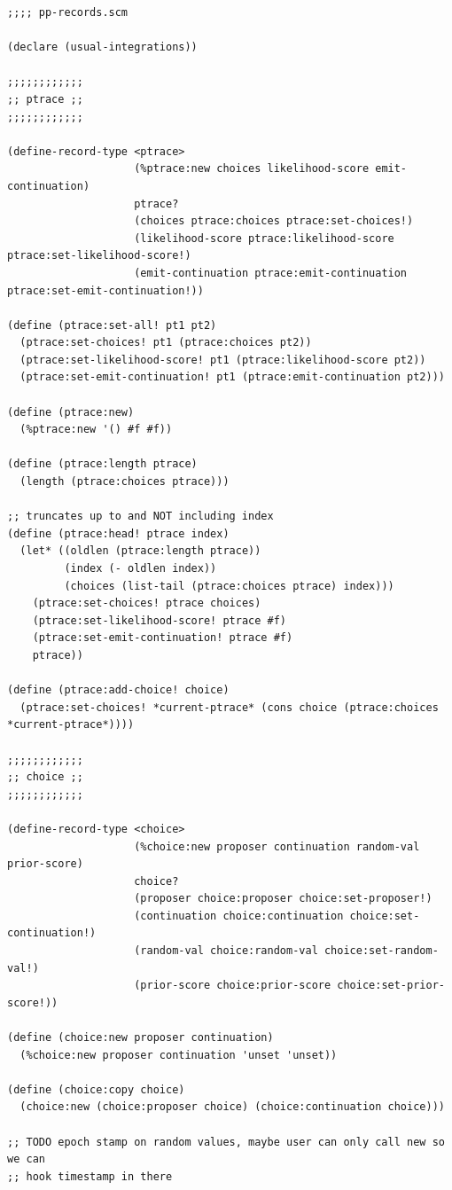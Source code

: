 \documentclass{article}
\begin{document}
\begin{verbatim}
;;;; pp-records.scm

(declare (usual-integrations))

;;;;;;;;;;;;
;; ptrace ;;
;;;;;;;;;;;;

(define-record-type <ptrace>
                    (%ptrace:new choices likelihood-score emit-continuation)
                    ptrace?
                    (choices ptrace:choices ptrace:set-choices!)
                    (likelihood-score ptrace:likelihood-score ptrace:set-likelihood-score!)
                    (emit-continuation ptrace:emit-continuation ptrace:set-emit-continuation!))

(define (ptrace:set-all! pt1 pt2)
  (ptrace:set-choices! pt1 (ptrace:choices pt2))
  (ptrace:set-likelihood-score! pt1 (ptrace:likelihood-score pt2))
  (ptrace:set-emit-continuation! pt1 (ptrace:emit-continuation pt2)))

(define (ptrace:new)
  (%ptrace:new '() #f #f))

(define (ptrace:length ptrace)
  (length (ptrace:choices ptrace)))

;; truncates up to and NOT including index
(define (ptrace:head! ptrace index)
  (let* ((oldlen (ptrace:length ptrace))
         (index (- oldlen index))
         (choices (list-tail (ptrace:choices ptrace) index)))
    (ptrace:set-choices! ptrace choices)
    (ptrace:set-likelihood-score! ptrace #f)
    (ptrace:set-emit-continuation! ptrace #f)
    ptrace))

(define (ptrace:add-choice! choice)
  (ptrace:set-choices! *current-ptrace* (cons choice (ptrace:choices *current-ptrace*))))

;;;;;;;;;;;;
;; choice ;;
;;;;;;;;;;;;

(define-record-type <choice>
                    (%choice:new proposer continuation random-val prior-score)
                    choice?
                    (proposer choice:proposer choice:set-proposer!)
                    (continuation choice:continuation choice:set-continuation!)
                    (random-val choice:random-val choice:set-random-val!)
                    (prior-score choice:prior-score choice:set-prior-score!))

(define (choice:new proposer continuation)
  (%choice:new proposer continuation 'unset 'unset))

(define (choice:copy choice)
  (choice:new (choice:proposer choice) (choice:continuation choice)))

;; TODO epoch stamp on random values, maybe user can only call new so we can
;; hook timestamp in there
\end{verbatim}
\end{document}
